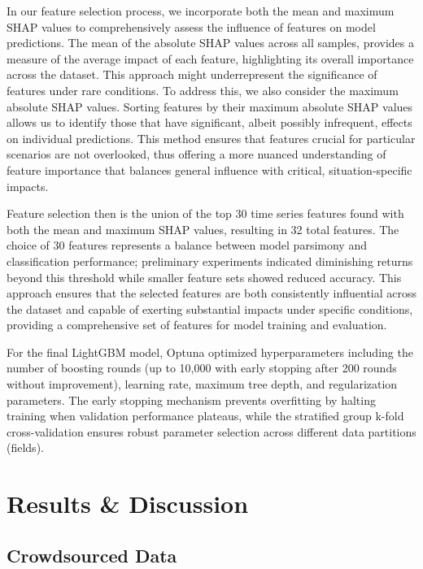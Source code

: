 \documentclass[
  journal,
  twocolumn]{IEEEtran}
\begin{document}
In our feature selection process, we incorporate both the mean and
maximum SHAP values to comprehensively assess the influence of features
on model predictions. The mean of the absolute SHAP values across all
samples, provides a measure of the average impact of each feature,
highlighting its overall importance across the dataset. This approach
might underrepresent the significance of features under rare conditions.
To address this, we also consider the maximum absolute SHAP values.
Sorting features by their maximum absolute SHAP values allows us to
identify those that have significant, albeit possibly infrequent,
effects on individual predictions. This method ensures that features
crucial for particular scenarios are not overlooked, thus offering a
more nuanced understanding of feature importance that balances general
influence with critical, situation-specific impacts.

Feature selection then is the union of the top 30 time series features
found with both the mean and maximum SHAP values, resulting in 32 total
features. The choice of 30 features represents a balance between model
parsimony and classification performance; preliminary experiments
indicated diminishing returns beyond this threshold while smaller
feature sets showed reduced accuracy. This approach ensures that the
selected features are both consistently influential across the dataset
and capable of exerting substantial impacts under specific conditions,
providing a comprehensive set of features for model training and
evaluation.

For the final LightGBM model, Optuna optimized hyperparameters including
the number of boosting rounds (up to 10,000 with early stopping after
200 rounds without improvement), learning rate, maximum tree depth, and
regularization parameters. The early stopping mechanism prevents
overfitting by halting training when validation performance plateaus,
while the stratified group k-fold cross-validation ensures robust
parameter selection across different data partitions (fields).

\hypertarget{results-discussion}{%
\section{Results \& Discussion}\label{results-discussion}}

\hypertarget{crowdsourced-data}{%
\subsection{Crowdsourced Data}\label{crowdsourced-data}}
\end{document}
